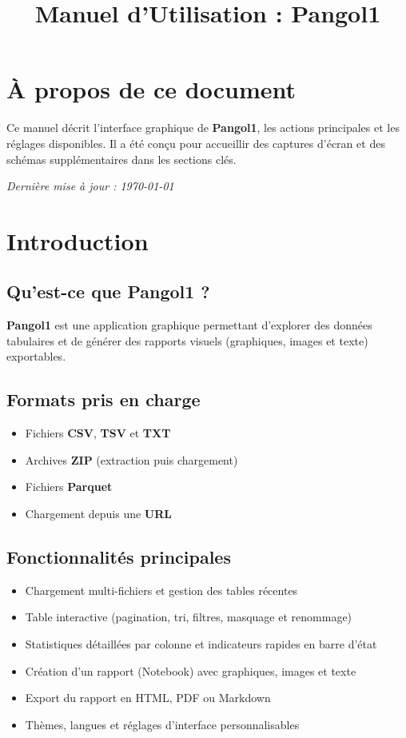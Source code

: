 \documentclass[11pt, a4paper]{article}
\title{Manuel d'Utilisation : Pangol1}
\author{}
\date{}
\begin{document}
\maketitle

\section*{À propos de ce document}
Ce manuel décrit l'interface graphique de \textbf{Pangol1}, les actions principales et les réglages disponibles. Il a été conçu pour accueillir des captures d'écran et des schémas supplémentaires dans les sections clés.

\vspace{2ex}
\noindent
{\small \textit{Dernière mise à jour : \today}}

\newpage

\tableofcontents

\newpage

\section{Introduction}

\subsection{Qu'est-ce que Pangol1 ?}
\textbf{Pangol1} est une application graphique permettant d'explorer des données tabulaires et de générer des rapports visuels (graphiques, images et texte) exportables.

\subsection{Formats pris en charge}
\begin{itemize}
    \item Fichiers \textbf{CSV}, \textbf{TSV} et \textbf{TXT}
    \item Archives \textbf{ZIP} (extraction puis chargement)
    \item Fichiers \textbf{Parquet}
    \item Chargement depuis une \textbf{URL}
\end{itemize}

\subsection{Fonctionnalités principales}
\begin{itemize}
    \item Chargement multi-fichiers et gestion des tables récentes
    \item Table interactive (pagination, tri, filtres, masquage et renommage)
    \item Statistiques détaillées par colonne et indicateurs rapides en barre d'état
    \item Création d'un rapport (Notebook) avec graphiques, images et texte
    \item Export du rapport en HTML, PDF ou Markdown
    \item Thèmes, langues et réglages d'interface personnalisables
\end{itemize}
\end{document}
